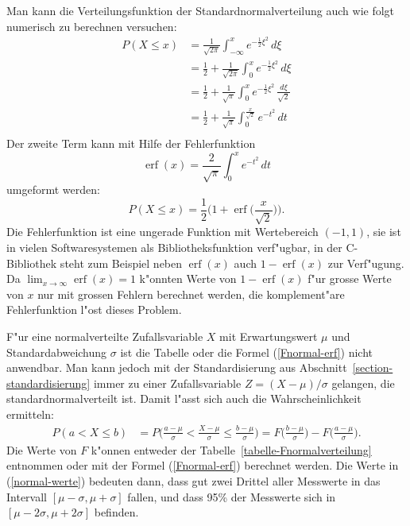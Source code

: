 Man kann die Verteilungsfunktion der Standardnormalverteilung auch wie folgt
numerisch zu berechnen versuchen:
\begin{equation}
\begin{aligned}
P(X\le x)
&=\frac1{\sqrt{2\pi}}\int_{-\infty}^xe^{-\frac12\xi^2}\,d\xi\\
&=\frac12+\frac1{\sqrt{2\pi}}\int_0^xe^{-\frac12\xi^2}\,d\xi\\
&=\frac12+\frac1{\sqrt{\pi}}\int_0^xe^{-\frac12\xi^2}\,\frac{d\xi}{\sqrt{2}}\\
&=\frac12+\frac1{\sqrt{\pi}}\int_0^{\frac{x}{\sqrt{2}}}e^{-t^2}\,dt\\
\end{aligned}
\label{normal-werte}
\end{equation}
Der zweite Term kann mit Hilfe der Fehlerfunktion 
\[
\operatorname{erf}(x)=\frac{2}{\sqrt{\pi}}\int_0^xe^{-t^2}\,dt
\]
umgeformt werden:
\begin{equation}
P(X\le x)=\frac12\biggl(1+\operatorname{erf}\biggl(\frac{x}{\sqrt{2}}\biggr)\biggr).
\label{Fnormal-erf}
\end{equation}
%
%
Die Fehlerfunktion ist eine ungerade Funktion mit Wertebereich $(-1,1)$,
sie ist in vielen Softwaresystemen als Bibliotheksfunktion verf"ugbar, in
der C-Bibliothek steht zum Beispiel neben $\operatorname{erf}(x)$ auch
$1-\operatorname{erf}(x)$ zur Verf"ugung.
Da $\lim_{x\to\infty}\operatorname{erf}(x)=1$ k"onnten Werte von
$1-\operatorname{erf}(x)$ f"ur grosse Werte von $x$ nur mit grossen Fehlern 
berechnet werden, die komplement"are Fehlerfunktion l"ost dieses Problem.

F"ur eine normalverteilte Zufallsvariable $X$ mit Erwartungswert $\mu$ und
Standardabweichung $\sigma$ ist die Tabelle oder die Formel (\ref{Fnormal-erf})
nicht anwendbar. 
Man kann jedoch mit der Standardisierung aus Abschnitt~\ref{section-standardisierung}
immer zu einer Zufallsvariable $Z=(X-\mu)/\sigma$ gelangen, die
standardnormalverteilt ist.
Damit l"asst sich auch die Wahrscheinlichkeit ermitteln:
\begin{align*}
P(a<X\le b)
&=
P\biggl(\frac{a-\mu}{\sigma}<\frac{X-\mu}{\sigma}\le \frac{b-\mu}{\sigma}\biggr)
=
F\biggl(\frac{b-\mu}{\sigma}\biggr)
-
F\biggl(\frac{a-\mu}{\sigma}\biggr).
\end{align*}
Die Werte von $F$ k"onnen entweder der Tabelle~\ref{tabelle-Fnormalverteilung}
entnommen oder mit der Formel (\ref{Fnormal-erf}) berechnet werden.
Die Werte in (\ref{normal-werte}) bedeuten dann, dass gut zwei Drittel aller
Messwerte in das Intervall $[\mu-\sigma, \mu+\sigma]$ fallen, und dass 
95\% der Messwerte sich in $[\mu-2\sigma,\mu+2\sigma]$ befinden.

